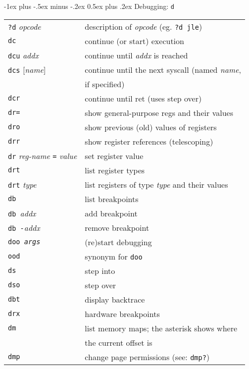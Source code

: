 \documentclass[a4paper,landscape]{article}
\makeatletter
\renewcommand{\section}{\@startsection{section}{1}{0mm}%
                                {-1ex plus -.5ex minus -.2ex}%
                                {0.5ex plus .2ex}%
                                {\normalfont\large\bfseries}}
\makeatother
\begin{document}
\begin{multicols*}{3}
\section{Debugging: \texttt{d}}
\begin{tabular}{@{}ll@{}}
\texttt{?d} \textit{opcode} & description of \textit{opcode} (eg. \texttt{?d jle}) \\
\texttt{dc} & continue (or start) execution \\
\texttt{dcu} \textit{addx} & continue until \textit{addx} is reached \\
\texttt{dcs} [\textit{name}] & continue until the next syscall (named \textit{name}, \\ & if specified) \\
\texttt{dcr} & continue until ret (uses step over) \\
\texttt{dr=} & show general-purpose regs and their values \\
\texttt{dro} & show previous (old) values of registers \\
\texttt{drr} & show register references (telescoping) \\
\texttt{dr} \textit{reg-name} \texttt{=} \textit{value} & set register value \\
\texttt{drt} & list register types \\
\texttt{drt} \textit{type} & list registers of type \textit{type} and their values \\
\texttt{db} & list breakpoints \\
\texttt{db }\textit{addx} & add breakpoint \\
\texttt{db -}\textit{addx} & remove breakpoint \\
\texttt{doo \textit{args}} & (re)start debugging \\
\texttt{ood} & synonym for \texttt{doo} \\
\texttt{ds} & step into \\
\texttt{dso} & step over \\
\texttt{dbt} & display backtrace \\
\texttt{drx} & hardware breakpoints \\
\texttt{dm} & list memory maps; the asterisk shows where \\ & the current offset is \\
\texttt{dmp} & change page permissions (see: \texttt{dmp?}) \\
\end{tabular}


\end{multicols*}
\end{document}
